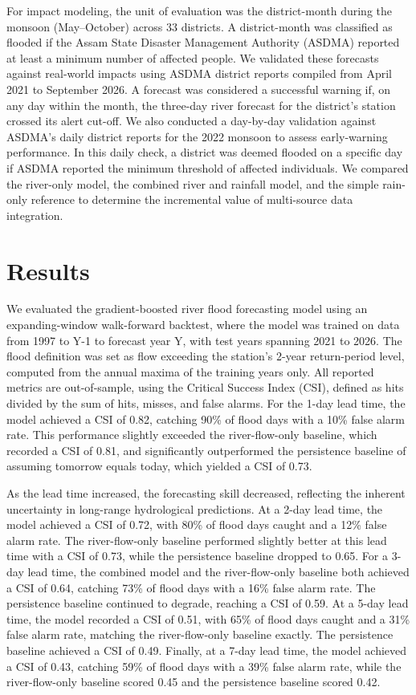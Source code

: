 \documentclass[conference]{IEEEtran}
\begin{document}
For impact modeling, the unit of evaluation was the district-month during the monsoon (May–October) across 33 districts. A district-month was classified as flooded if the Assam State Disaster Management Authority (ASDMA) reported at least a minimum number of affected people. We validated these forecasts against real-world impacts using ASDMA district reports compiled from April 2021 to September 2026. A forecast was considered a successful warning if, on any day within the month, the three-day river forecast for the district's station crossed its alert cut-off. We also conducted a day-by-day validation against ASDMA's daily district reports for the 2022 monsoon to assess early-warning performance. In this daily check, a district was deemed flooded on a specific day if ASDMA reported the minimum threshold of affected individuals. We compared the river-only model, the combined river and rainfall model, and the simple rain-only reference to determine the incremental value of multi-source data integration.

\section{Results}
We evaluated the gradient-boosted river flood forecasting model using an expanding-window walk-forward backtest, where the model was trained on data from 1997 to Y-1 to forecast year Y, with test years spanning 2021 to 2026. The flood definition was set as flow exceeding the station's 2-year return-period level, computed from the annual maxima of the training years only. All reported metrics are out-of-sample, using the Critical Success Index (CSI), defined as hits divided by the sum of hits, misses, and false alarms. For the 1-day lead time, the model achieved a CSI of 0.82, catching 90\% of flood days with a 10\% false alarm rate. This performance slightly exceeded the river-flow-only baseline, which recorded a CSI of 0.81, and significantly outperformed the persistence baseline of assuming tomorrow equals today, which yielded a CSI of 0.73.

As the lead time increased, the forecasting skill decreased, reflecting the inherent uncertainty in long-range hydrological predictions. At a 2-day lead time, the model achieved a CSI of 0.72, with 80\% of flood days caught and a 12\% false alarm rate. The river-flow-only baseline performed slightly better at this lead time with a CSI of 0.73, while the persistence baseline dropped to 0.65. For a 3-day lead time, the combined model and the river-flow-only baseline both achieved a CSI of 0.64, catching 73\% of flood days with a 16\% false alarm rate. The persistence baseline continued to degrade, reaching a CSI of 0.59. At a 5-day lead time, the model recorded a CSI of 0.51, with 65\% of flood days caught and a 31\% false alarm rate, matching the river-flow-only baseline exactly. The persistence baseline achieved a CSI of 0.49. Finally, at a 7-day lead time, the model achieved a CSI of 0.43, catching 59\% of flood days with a 39\% false alarm rate, while the river-flow-only baseline scored 0.45 and the persistence baseline scored 0.42.
\end{document}
